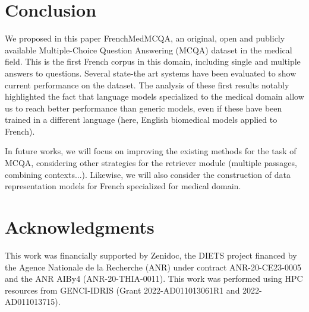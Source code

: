 \documentclass[11pt]{article}
\begin{document}
\section{Conclusion}
\label{sec:conclusion}



We proposed in this paper FrenchMedMCQA, an original, open and publicly available Multiple-Choice Question Answering (MCQA) dataset in the medical field. This is the first French corpus in this domain, including single and multiple answers to questions. 
Several state-the art systems have been evaluated to show current performance on the  dataset. The analysis of these first results notably highlighted the fact that language models specialized to the medical domain allow us to reach better performance than generic models, even if these have been trained in a different language (here, English biomedical models applied to French).

In future works, we will focus on improving the existing methods for the task of MCQA, considering other strategies for the retriever module (multiple passages, combining contexts...). Likewise, we will also consider the construction of data representation models for French specialized for medical domain.






 \section{Acknowledgments}
 \label{sec:acknowledgements}

This work was financially supported by Zenidoc, the DIETS project financed by the Agence Nationale de la Recherche (ANR) under contract ANR-20-CE23-0005 and the ANR AIBy4 (ANR-20-THIA-0011). This work was performed using HPC resources from GENCI-IDRIS (Grant 2022-AD011013061R1 and 2022-AD011013715).



\end{document}
